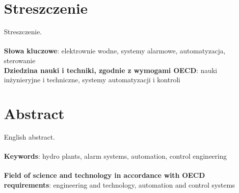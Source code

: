 \chapter*{Streszczenie}

Streszczenie. \\\\
\noindent
\textbf{Słowa kluczowe}: elektrownie wodne, systemy alarmowe, automatyzacja, sterowanie
\\

\noindent
\textbf{Dziedzina nauki i techniki, zgodnie z wymogami OECD}: nauki inżynieryjne i techniczne, systemy automatyzacji i kontroli
\chapter*{Abstract}
English abstract. \\\\
\noindent
\textbf{Keywords}: hydro plants, alarm systems, automation, control engineering\\\\
\noindent
\textbf{Field    of    science    and    technology    in    accordance    with    OECD    requirements}: engineering and technology, automation  and  control  systems